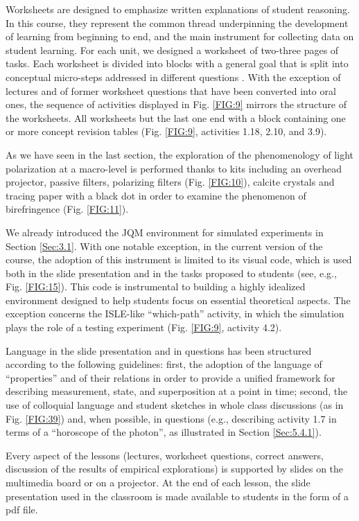 \documentclass[twocolumn,secnumarabic,amssymb, nobibnotes, aps, prd, nofootinbib]{revtex4-2}
\begin{document}
Worksheets are designed to emphasize written explanations of student reasoning. In this course, they represent the common thread underpinning the development of learning from beginning to end, and the main instrument for collecting data on student learning. For each unit, we designed a worksheet of two-three pages of tasks. Each worksheet is divided into blocks with a general goal that is split into conceptual micro-steps addressed in different questions \cite{McDermott2013}. With the exception of lectures and of former worksheet questions that have been converted into oral ones, the sequence of activities displayed in Fig. \ref{FIG:9} mirrors the structure of the worksheets. All worksheets but the last one end with a block containing one or more concept revision tables (Fig. \ref{FIG:9}, activities 1.18, 2.10, and 3.9).

As we have seen in the last section, the exploration of the phenomenology of light polarization at a macro-level is performed
thanks to kits including an overhead projector, passive filters, polarizing filters (Fig. \ref{FIG:10}), calcite crystals and tracing paper with a black dot in order to examine the phenomenon of birefringence (Fig. \ref{FIG:11}).

We already introduced the JQM environment for simulated experiments in Section \ref{Sec:3.1}. With one notable exception, in the current version of the course, the adoption of this instrument is limited to its visual code, which is used both in the slide presentation and in the tasks proposed to students (see, e.g., Fig. \ref{FIG:15}). This code is instrumental to building a highly idealized environment designed to help students focus on essential theoretical aspects. The exception concerns the ISLE-like ``which-path'' activity, in which the simulation plays the role of a testing experiment  (Fig. \ref{FIG:9}, activity 4.2).

Language in the slide presentation and in questions has been structured according to the following guidelines: first, the adoption of the language of ``properties'' and of their relations in order to provide a unified framework for describing measurement, state, and superposition at a point in time; second, the use of colloquial language and student sketches in whole class discussions (as in Fig. \ref{FIG:39}) and, when possible, in questions (e.g., describing activity 1.7 in terms of a ``horoscope of the photon'', as illustrated in Section \ref{Sec:5.4.1}).

Every aspect of the lessons (lectures, worksheet questions, correct answers, discussion of the results of empirical explorations) is supported by slides on the multimedia board or on a projector. At the end of each lesson, the slide presentation used in the classroom is made available to students in the form of a pdf file.
\end{document}
